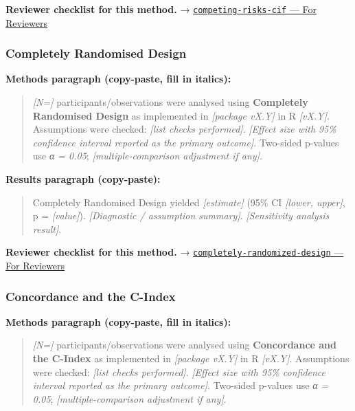 \documentclass[
]{article}
\begin{document}
\textbf{Reviewer checklist for this method.} →
\href{../chapters/11-survival/competing-risks-cif.Rmd\#for-reviewers}{\texttt{competing-risks-cif}
--- For Reviewers}

\subsubsection{Completely Randomised
Design}\label{completely-randomised-design}

\textbf{Methods paragraph (copy-paste, fill in italics):}

\begin{quote}
\emph{{[}N={]}} participants/observations were analysed using
\textbf{Completely Randomised Design} as implemented in \emph{{[}package
vX.Y{]}} in R \emph{{[}vX.Y{]}}. Assumptions were checked: \emph{{[}list
checks performed{]}}. \emph{{[}Effect size with 95\% confidence interval
reported as the primary outcome{]}}. Two-sided p-values use \emph{α =
0.05}; \emph{{[}multiple-comparison adjustment if any{]}}.
\end{quote}

\textbf{Results paragraph (copy-paste):}

\begin{quote}
Completely Randomised Design yielded \emph{{[}estimate{]}} (95\% CI
\emph{{[}lower, upper{]}}, p = \emph{{[}value{]}}). \emph{{[}Diagnostic
/ assumption summary{]}}. \emph{{[}Sensitivity analysis result{]}}.
\end{quote}

\textbf{Reviewer checklist for this method.} →
\href{../chapters/16-design/completely-randomized-design.Rmd\#for-reviewers}{\texttt{completely-randomized-design}
--- For Reviewers}

\subsubsection{Concordance and the
C-Index}\label{concordance-and-the-c-index}

\textbf{Methods paragraph (copy-paste, fill in italics):}

\begin{quote}
\emph{{[}N={]}} participants/observations were analysed using
\textbf{Concordance and the C-Index} as implemented in \emph{{[}package
vX.Y{]}} in R \emph{{[}vX.Y{]}}. Assumptions were checked: \emph{{[}list
checks performed{]}}. \emph{{[}Effect size with 95\% confidence interval
reported as the primary outcome{]}}. Two-sided p-values use \emph{α =
0.05}; \emph{{[}multiple-comparison adjustment if any{]}}.
\end{quote}
\end{document}

